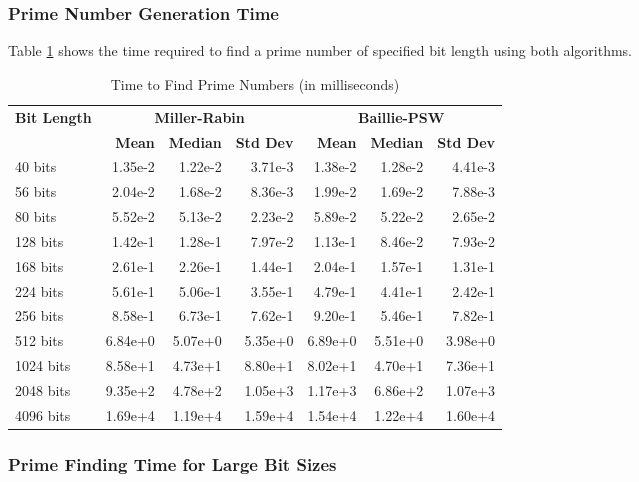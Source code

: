 \subsubsection{Prime Number Generation Time}

Table \ref{tab:find_prime} shows the time required to find a prime number of specified bit length using both algorithms.

\begin{table}[H]
\centering
\caption{Time to Find Prime Numbers (in milliseconds)}
\label{tab:find_prime}
\begin{tabular}{@{}lrrrrrr@{}}
\toprule
\multirow{2}{*}{\textbf{Bit Length}} & \multicolumn{3}{c}{\textbf{Miller-Rabin}} & \multicolumn{3}{c}{\textbf{Baillie-PSW}} \\
\cmidrule(lr){2-4} \cmidrule(lr){5-7}
& \textbf{Mean} & \textbf{Median} & \textbf{Std Dev} & \textbf{Mean} & \textbf{Median} & \textbf{Std Dev} \\
\midrule
40 bits     & 1.35e-2 & 1.22e-2 & 3.71e-3 & 1.38e-2 & 1.28e-2 & 4.41e-3 \\
56 bits     & 2.04e-2 & 1.68e-2 & 8.36e-3 & 1.99e-2 & 1.69e-2 & 7.88e-3 \\
80 bits     & 5.52e-2 & 5.13e-2 & 2.23e-2 & 5.89e-2 & 5.22e-2 & 2.65e-2 \\
128 bits    & 1.42e-1 & 1.28e-1 & 7.97e-2 & 1.13e-1 & 8.46e-2 & 7.93e-2 \\
168 bits    & 2.61e-1 & 2.26e-1 & 1.44e-1 & 2.04e-1 & 1.57e-1 & 1.31e-1 \\
224 bits    & 5.61e-1 & 5.06e-1 & 3.55e-1 & 4.79e-1 & 4.41e-1 & 2.42e-1 \\
256 bits    & 8.58e-1 & 6.73e-1 & 7.62e-1 & 9.20e-1 & 5.46e-1 & 7.82e-1 \\
512 bits    & 6.84e+0 & 5.07e+0 & 5.35e+0 & 6.89e+0 & 5.51e+0 & 3.98e+0 \\
1024 bits   & 8.58e+1 & 4.73e+1 & 8.80e+1 & 8.02e+1 & 4.70e+1 & 7.36e+1 \\
2048 bits   & 9.35e+2 & 4.78e+2 & 1.05e+3 & 1.17e+3 & 6.86e+2 & 1.07e+3 \\
4096 bits   & 1.69e+4 & 1.19e+4 & 1.59e+4 & 1.54e+4 & 1.22e+4 & 1.60e+4 \\
\bottomrule
\end{tabular}
\end{table}

\subsubsection{Prime Finding Time for Large Bit Sizes}

